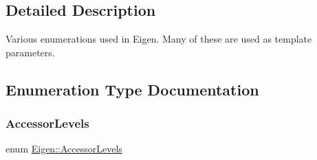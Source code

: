 \subsection{Detailed Description}
Various enumerations used in Eigen. Many of these are used as template parameters. 

\subsection{Enumeration Type Documentation}
\mbox{\label{group__enums_ga9f93eac38eb83deb0e8dbd42ddf11d5d}} 
\subsubsection{\texorpdfstring{Accessor\+Levels}{AccessorLevels}\hspace{0.1cm}{\footnotesize\ttfamily [1/2]}}
{\footnotesize\ttfamily enum \hyperlink{group__enums_ga9f93eac38eb83deb0e8dbd42ddf11d5d}{Eigen\+::\+Accessor\+Levels}}

